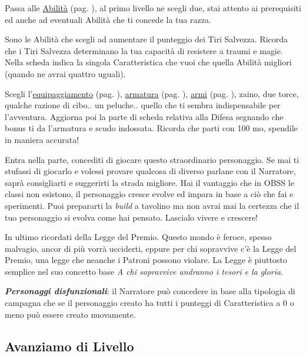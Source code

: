\begin{multicols}{2}
Passa alle \hyperlink{abilita}{Abilità} (pag. \pageref{abilita}), al primo livello ne scegli due, stai attento ai prerequisiti ed anche ad eventuali Abilità che ti concede la tua razza.

Sono le Abilità che scegli ad aumentare il punteggio dei Tiri Salvezza. Ricorda che i Tiri Salvezza determinano la tua capacità di resistere a traumi e magie. Nella scheda indica la singola Caratteristica che vuoi che quella Abilità migliori (quando ne avrai quattro uguali).

Scegli l'\hyperlink{equipaggiamento}{equipaggiamento} (pag. \pageref{equipaggiamento}), \hyperlink{equipaggiamento.armature.scudi}{armatura} (pag. \pageref{equipaggiamentoarmature}), \hyperlink{equipaggiamento.armi}{armi} (pag. \pageref{equipaggiamentoarmi}), zaino, due torce, qualche razione di cibo.. un peluche.. quello che ti sembra indispensabile per l'avventura.
Aggiorna poi la parte di scheda relativa alla Difesa segnando che bonus ti da l'armatura e scudo indossata. Ricorda che parti con 100 mo, spendile in maniera accurata!

Entra nella parte, concediti di giocare questo straordinario personaggio. Se mai ti stufassi di giocarlo e volessi provare qualcosa di diverso parlane con il Narratore, saprà consigliarti e suggerirti la strada migliore.
Hai il vantaggio che in OBSS le classi non esistono, il personaggio cresce evolve ed impara in base a ciò che fai e sperimenti. Puoi prepararti la \emph{build} a tavolino ma non avrai mai la certezza che il tuo personaggio si evolva come hai pensato. Lascialo vivere e crescere!

In ultimo ricordati della Legge del Premio. Questo mondo è feroce, spesso malvagio, ancor di più vorrà ucciderti, eppure per chi sopravvive c'è la Legge del Premio, una legge che neanche i Patroni possono violare. La Legge è piuttosto semplice nel suo concetto base \emph{A chi sopravvive andranno i tesori e la gloria}.

\begin{changemargin}{0.3cm}{0.3cm}\begin{narratore}
\emph{\textbf{Personaggi disfunzionali}}: il Narratore può concedere in base alla tipologia di campagna che se il personaggio creato ha tutti i punteggi di Caratteristica a 0 o meno può essere creato nuovamente.
\end{narratore}\end{changemargin}

\subsection{Avanziamo di Livello}\label{avanzamentodilivello}


\end{multicols}
